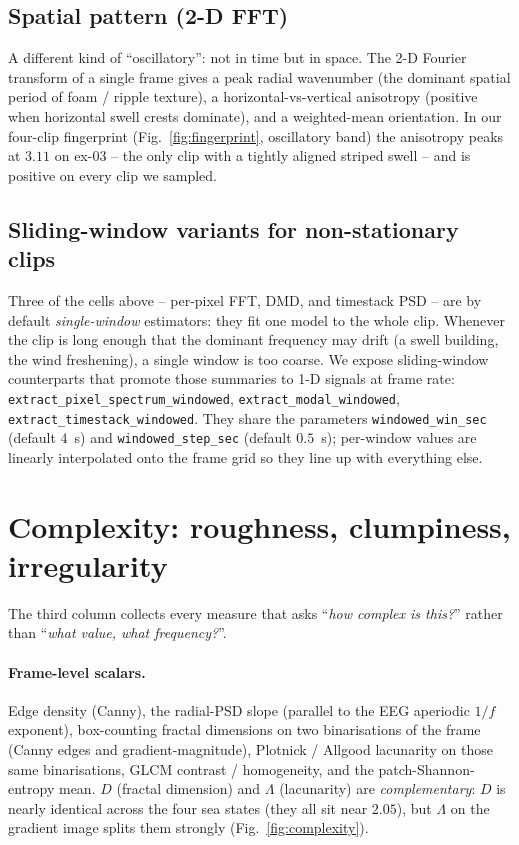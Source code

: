 \documentclass[11pt,a4paper]{article}
\newcommand{\code}[1]{\texttt{\small #1}}
\begin{document}
\subsection{Spatial pattern (2-D FFT)}\label{sec:spatial-fft}

A different kind of ``oscillatory'': not in time but in space. The
2-D Fourier transform of a single frame gives a peak radial
wavenumber (the dominant spatial period of foam / ripple texture), a
horizontal-vs-vertical anisotropy (positive when horizontal swell
crests dominate), and a weighted-mean orientation. In our four-clip
fingerprint (Fig.~\ref{fig:fingerprint}, oscillatory band) the
anisotropy peaks at $3.11$ on \textcolor{ex03}{ex-03} -- the only
clip with a tightly aligned striped swell -- and is positive on every
clip we sampled.

\subsection{Sliding-window variants for non-stationary clips}

Three of the cells above -- per-pixel FFT, DMD, and timestack PSD --
are by default \emph{single-window} estimators: they fit one model to
the whole clip. Whenever the clip is long enough that the dominant
frequency may drift (a swell building, the wind freshening), a single
window is too coarse. We expose sliding-window counterparts that
promote those summaries to 1-D signals at frame rate:
\code{extract\_pixel\_spectrum\_windowed},
\code{extract\_modal\_windowed}, \code{extract\_timestack\_windowed}.
They share the parameters \code{windowed\_win\_sec} (default $4$~s)
and \code{windowed\_step\_sec} (default $0.5$~s); per-window values
are linearly interpolated onto the frame grid so they line up with
everything else.

\section{Complexity: roughness, clumpiness, irregularity}\label{sec:cplx}

The third column collects every measure that asks ``\emph{how complex
is this?}'' rather than ``\emph{what value, what frequency?}''.

\paragraph{Frame-level scalars.} Edge density (Canny), the
radial-PSD slope (parallel to the EEG aperiodic $1/f$ exponent),
box-counting fractal dimensions on two binarisations of the frame
(Canny edges and gradient-magnitude), Plotnick / Allgood lacunarity
on those same binarisations, GLCM contrast / homogeneity, and the
patch-Shannon-entropy mean. $D$ (fractal dimension) and $\Lambda$
(lacunarity) are \emph{complementary}: $D$ is nearly identical
across the four sea states (they all sit near $2.05$), but $\Lambda$
on the gradient image splits them strongly
(Fig.~\ref{fig:complexity}).
\end{document}
